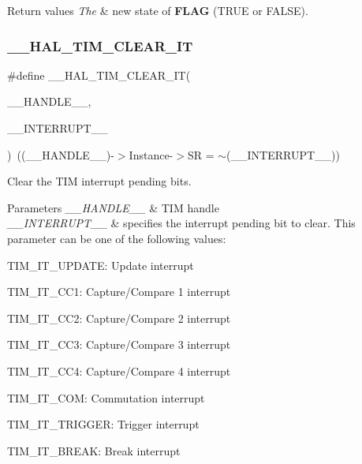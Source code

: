 \begin{DoxyRetVals}{Return values}
{\em The} & new state of {\bfseries F\+L\+AG} (T\+R\+UE or F\+A\+L\+SE). \\
\hline
\end{DoxyRetVals}
\mbox{\label{group___t_i_m___exported___macros_gaea68155ce77e591e0c2582def061d6f0}} 
\subsubsection{\texorpdfstring{\+\_\+\+\_\+\+H\+A\+L\+\_\+\+T\+I\+M\+\_\+\+C\+L\+E\+A\+R\+\_\+\+IT}{\_\_HAL\_TIM\_CLEAR\_IT}}
{\footnotesize\ttfamily \#define \+\_\+\+\_\+\+H\+A\+L\+\_\+\+T\+I\+M\+\_\+\+C\+L\+E\+A\+R\+\_\+\+IT(\begin{DoxyParamCaption}\item[{}]{\+\_\+\+\_\+\+H\+A\+N\+D\+L\+E\+\_\+\+\_\+,  }\item[{}]{\+\_\+\+\_\+\+I\+N\+T\+E\+R\+R\+U\+P\+T\+\_\+\+\_\+ }\end{DoxyParamCaption})~((\+\_\+\+\_\+\+H\+A\+N\+D\+L\+E\+\_\+\+\_\+)-\/$>$Instance-\/$>$SR = $\sim$(\+\_\+\+\_\+\+I\+N\+T\+E\+R\+R\+U\+P\+T\+\_\+\+\_\+))}



Clear the T\+IM interrupt pending bits. 


\begin{DoxyParams}{Parameters}
{\em \+\_\+\+\_\+\+H\+A\+N\+D\+L\+E\+\_\+\+\_\+} & T\+IM handle \\
\hline
{\em \+\_\+\+\_\+\+I\+N\+T\+E\+R\+R\+U\+P\+T\+\_\+\+\_\+} & specifies the interrupt pending bit to clear. This parameter can be one of the following values\+: \begin{DoxyItemize}
\item T\+I\+M\+\_\+\+I\+T\+\_\+\+U\+P\+D\+A\+TE\+: Update interrupt \item T\+I\+M\+\_\+\+I\+T\+\_\+\+C\+C1\+: Capture/\+Compare 1 interrupt \item T\+I\+M\+\_\+\+I\+T\+\_\+\+C\+C2\+: Capture/\+Compare 2 interrupt \item T\+I\+M\+\_\+\+I\+T\+\_\+\+C\+C3\+: Capture/\+Compare 3 interrupt \item T\+I\+M\+\_\+\+I\+T\+\_\+\+C\+C4\+: Capture/\+Compare 4 interrupt \item T\+I\+M\+\_\+\+I\+T\+\_\+\+C\+OM\+: Commutation interrupt \item T\+I\+M\+\_\+\+I\+T\+\_\+\+T\+R\+I\+G\+G\+ER\+: Trigger interrupt \item T\+I\+M\+\_\+\+I\+T\+\_\+\+B\+R\+E\+AK\+: Break interrupt \end{DoxyItemize}
\\
\hline
\end{DoxyParams}


